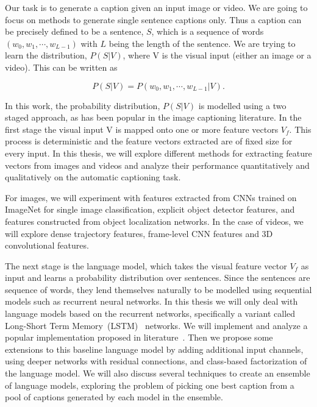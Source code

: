 Our task is to generate a caption given an input image or video. 
We are going to focus on methods to generate single sentence captions only. 
Thus a caption can be precisely defined to be a sentence, $S$, which is a
sequence of words $(w_0, w_1,\cdots, w_{L-1})$ with $L$ being the length of the
sentence. 
We are trying to learn the distribution, $P(S|V)$, where V is the visual
input (either an image or a video). 
This can be written as 

\begin{equation}
\label{eq:langB1} P(S|V) = P(w_0, w_1, \cdots, w_{L-1}|V)  .
\end{equation}

In this work, the probability distribution, $P(S|V)$ is modelled using a two
staged approach, as has been popular in the image captioning literature. 
In the first stage the visual input V is mapped onto one or more feature
vectors $V_f$.
This process is deterministic and the feature vectors extracted are of fixed
size for every input. 
In this thesis, we will explore different methods for extracting feature
vectors from images and videos and analyze their performance quantitatively and
qualitatively on the automatic captioning task. 

For images, we will experiment with features extracted from CNNs trained on
ImageNet for single image classification, explicit object detector features, and
features constructed from object localization networks.
In the case of videos, we will explore dense trajectory features, frame-level
CNN features and 3D convolutional features. 

The next stage is the language model, which takes the visual feature vector
$V_f$ as input and learns a probability distribution over sentences.
Since the sentences are sequence of words, they lend themselves naturally to be
modelled using sequential models such as recurrent neural networks.
In this thesis we will only deal with language models based on the recurrent
networks, specifically a variant called Long-Short Term
Memory~(LSTM)~\cite{Hochreiter1997} networks.
We will implement and analyze a popular implementation proposed in
literature~\cite{Vinyals_2015_CVPR}.
Then we propose some extensions to this baseline language model by adding
additional input channels, using deeper networks with residual connections,
and class-based factorization of the language model. 
We will also discuss several techniques to create an ensemble of language
models, exploring the problem of picking one best caption from a pool of
captions generated by each model in the ensemble.

